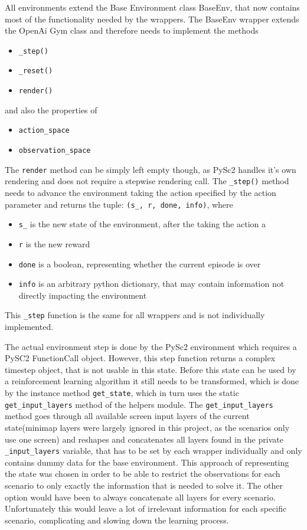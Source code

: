 All environments extend the Base Environment class BaseEnv, that now contains most of the functionality needed by the wrappers.
The BaseEnv wrapper extends the OpenAi Gym class and therefore needs to implement the methods

\begin{itemize}
\item \lstinline{_step()}
\item \lstinline{_reset()}
\item \lstinline{render()}
\end{itemize}
and also the properties of
\begin{itemize}
\item \lstinline{action_space}
\item \lstinline{observation_space}
\end{itemize}

The \lstinline{render} method can be simply left empty though, as PySc2 handles it's own rendering and does not require a stepwise rendering call. The \lstinline{_step()} method needs to advance the environment taking the action specified by the action parameter and returns the tuple: \lstinline{(s_, r, done, info)}, where

\begin{itemize}
\item \lstinline{s_} is the new state of the environment, after the taking the action a
\item \lstinline{r} is the new reward
\item \lstinline{done} is a boolean, representing whether the current episode is over
\item \lstinline{info} is an arbitrary python dictionary, that may contain information not directly impacting the environment
\end{itemize}

This \lstinline{_step} function is the same for all wrappers and is not individually implemented.

The actual environment step is done by the PySc2 environment which requires a PySC2 FunctionCall object. However, this step function returns a complex timestep object, that is not usable in this state. Before this state can be used by a reinforcement learning algorithm it still needs to be transformed, which is done by the instance method \lstinline{get_state}, which in turn uses the static \lstinline{get_input_layers} method of the helpers module. The \lstinline{get_input_layers} method goes through all available screen input layers of the current state(minimap layers were largely ignored in this project, as the scenarios only use one screen) and reshapes and concatenates all layers found in the private \lstinline{_input_layers} variable, that has to be set by each wrapper individually and only contains dummy data for the base environment. This approach of representing the state was chosen in order to be able to restrict the observations for each scenario to only exactly the information that is needed to solve it. The other option would have been to always concatenate all layers for every scenario. Unfortunately this would leave a lot of irrelevant information for each specific scenario, complicating and slowing down the learning process.

